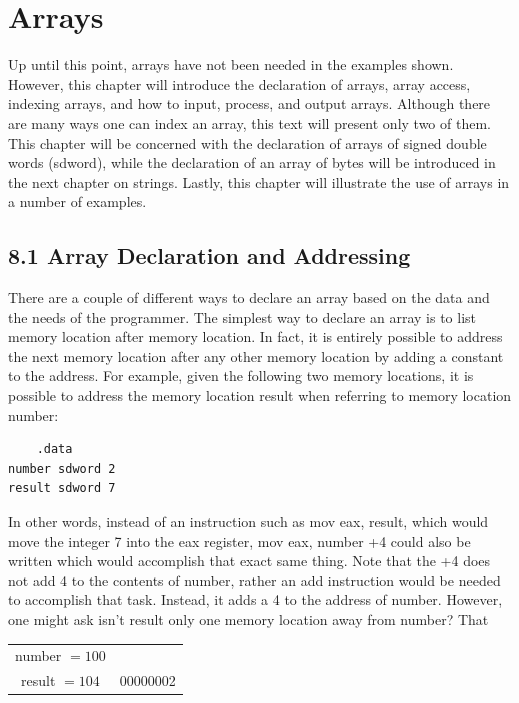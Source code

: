 \documentclass[10pt]{book}
\begin{document}
\section*{Arrays}
Up until this point, arrays have not been needed in the examples shown. However, this chapter will introduce the declaration of arrays, array access, indexing arrays, and how to input, process, and output arrays. Although there are many ways one can index an array, this text will present only two of them. This chapter will be concerned with the declaration of arrays of signed double words (sdword), while the declaration of an array of bytes will be introduced in the next chapter on strings. Lastly, this chapter will illustrate the use of arrays in a number of examples.

\subsection*{8.1 Array Declaration and Addressing}
There are a couple of different ways to declare an array based on the data and the needs of the programmer. The simplest way to declare an array is to list memory location after memory location. In fact, it is entirely possible to address the next memory location after any other memory location by adding a constant to the address. For example, given the following two memory locations, it is possible to address the memory location result when referring to memory location number:

\begin{verbatim}
    .data
number sdword 2
result sdword 7
\end{verbatim}

In other words, instead of an instruction such as mov eax, result, which would move the integer 7 into the eax register, mov eax, number +4 could also be written which would accomplish that exact same thing. Note that the +4 does not add 4 to the contents of number, rather an add instruction would be needed to accomplish that task. Instead, it adds a 4 to the address of number. However, one might ask isn't result only one memory location away from number? That

\begin{center}
\begin{tabular}{c|c|}
number $=100$ &  \\
result $=104$ & 00000002 \\
\hline
\end{tabular}
\end{center}
\end{document}
